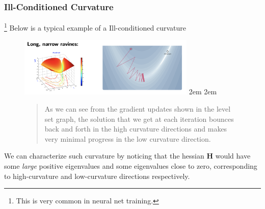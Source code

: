 \documentclass[11pt]{article}
\begin{document}
\subsubsection{Ill-Conditioned Curvature}\footnote{This is very common in neural net training.}
Below is a typical example\cite{week4} of a Ill-conditioned curvature
\begin{figure}[H]
    \center \includegraphics[width=0.75\textwidth]{img/ravine}
    \advance\leftmargini 2em
    \advance\rightmargin 2em
    \begin{quotation}
        As we can see from the gradient updates shown in the level set graph, the solution that we get at each iteration bounces back and forth in the high curvature directions and makes very minimal progress in the low curvature direction. 
    \end{quotation}
\end{figure}
\noindent We can characterize such curvature by noticing that the hessian $\mathbf{H}$ would have some \textit{large} positive eigenvalues and some eigenvalues close to zero, corresponding to high-curvature and low-curvature directions respectively.
\end{document}
